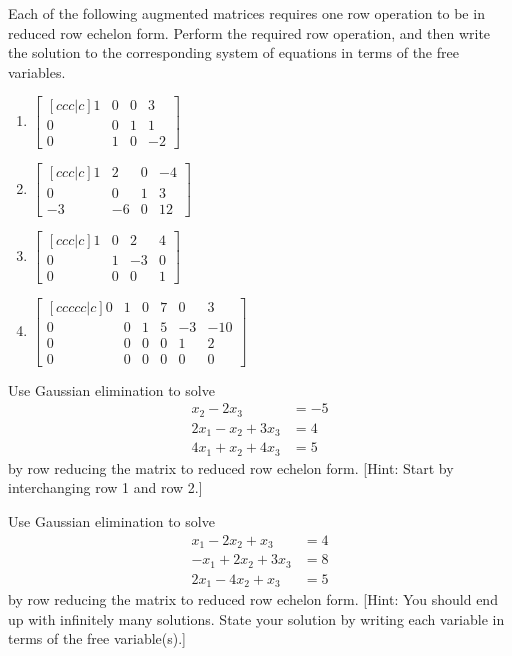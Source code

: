 \begin{problem}
Each of the following augmented matrices requires one row operation to be in reduced row echelon form. Perform the required row operation, and then write the solution to the corresponding system of equations in terms of the free variables.
\begin{multicols}{2}
\begin{enumerate}
	\item 
$
\begin{bmatrix}[ccc|c]
 1 & 0 & 0 & 3 \\
 0 & 0 & 1 & 1 \\
 0 & 1 & 0 & -2
\end{bmatrix}
$
	\item 
$
\begin{bmatrix}[ccc|c]
 1 & 2 & 0 & -4 \\
 0 & 0 & 1 & 3 \\
 -3 & -6 & 0 & 12
\end{bmatrix}
$
	\item 
$
\begin{bmatrix}[ccc|c]
 1 & 0 & 2 & 4 \\
 0 & 1 & -3 & 0 \\
 0 & 0 & 0 & 1
\end{bmatrix}
$
	\item 
$
\begin{bmatrix}[ccccc|c]
 0 & 1 & 0 & 7 & 0 & 3 \\
 0 & 0 & 1 & 5 & -3 & -10 \\
 0 & 0 & 0 & 0 & 1 & 2 \\
 0 & 0 & 0 & 0 & 0 & 0
\end{bmatrix}
$
\end{enumerate}
\end{multicols}
\end{problem}

\begin{problem}
Use Gaussian elimination to solve 
 $$
\begin{array}{rl}
  x_2 -2x_3 &= -5 \\
 2x_1 -x_2 + 3x_3 &= 4 \\
 4x_1 +x_2 + 4x_3 &= 5
\end{array}
$$
by row reducing the matrix to reduced row echelon form.
[Hint: Start by interchanging row 1 and row 2.] 
\end{problem}

\begin{problem}
Use Gaussian elimination to solve 
 $$
\begin{array}{rl}
 x_1 -2x_2 +x_3 &= 4 \\
 -x_1 + 2x_2 + 3x_3 &= 8 \\
 2x_1  -4x_2 +x_3 &= 5
\end{array}
$$
by row reducing the matrix to reduced row echelon form.
[Hint: You should end up with infinitely many solutions. State your solution by writing each variable in terms of the free variable(s).]
\end{problem}

